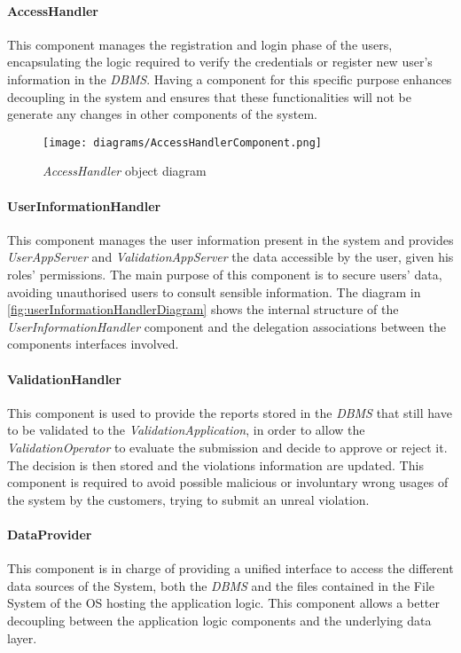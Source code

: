 \paragraph{AccessHandler}
This component manages the registration and login phase of the users, encapsulating the logic required to verify the credentials or register new user's information in the \textit{DBMS}. Having a component for this specific purpose enhances decoupling in the system and ensures that these functionalities will not be generate any changes in other components of the system.\newline\newline
\begin{figure}[h!]
	\centering
	\texttt{[image: diagrams/AccessHandlerComponent.png]}
	\caption{
		\label{fig:accessHandlerComponentDiagram} 
		\emph{AccessHandler} object diagram
	}
\end{figure}
\paragraph{UserInformationHandler}
This component manages the user information present in the system and provides \textit{UserAppServer} and \textit{ValidationAppServer} the data accessible by the user, given his roles' permissions. The main purpose of this component is to secure users' data, avoiding unauthorised users to consult sensible information. The diagram in \autoref{fig:userInformationHandlerDiagram} shows the internal structure of the \textit{UserInformationHandler} component and the delegation associations between the components interfaces involved.
\paragraph{ValidationHandler}
This component is used to provide the reports stored in the \textit{DBMS} that still have to be validated to the \textit{ValidationApplication}, in order to allow the \textit{ValidationOperator} to evaluate the submission and decide to approve or reject it. The decision is then stored and the violations information are updated. This component is required to avoid possible malicious or involuntary wrong usages of the system by the customers, trying to submit an unreal violation.
\paragraph{DataProvider}
This component is in charge of providing a unified interface to access the different data sources of the System, both the \textit{DBMS} and the files contained in the File System of the OS hosting the application logic. This component allows a better decoupling between the application logic components and the underlying data layer. \newline\newline\newline

